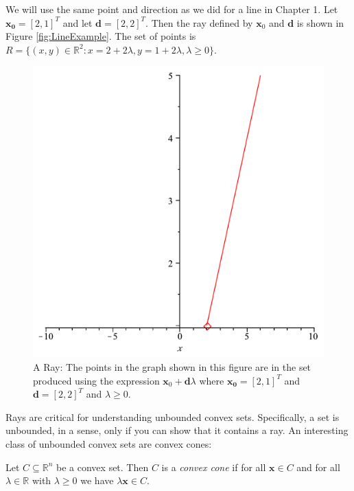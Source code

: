 \begin{example} We will use the same point and direction as we did for a line in Chapter 1. Let $\mathbf{x_0} = [2,1]^T$ and let $\mathbf{d} = [2,2]^T$. Then the ray defined by $\mathbf{x}_0$ and $\mathbf{d}$ is shown in Figure \ref{fig:LineExample}. The set of points is $R = \{(x,y) \in \mathbb{R}^2 : x = 2 + 2\lambda, y = 1 + 2\lambda, \lambda \geq 0\}$. 
\begin{figure}[ht]
\centering
\includegraphics[scale=0.25]{Ray.pdf}
\caption{A Ray: The points in the graph shown in this figure are in the set produced using the expression $\mathbf{x}_0 + \mathbf{d}\lambda$ where $\mathbf{x_0} = [2,1]^T$ and $\mathbf{d} = [2,2]^T$ and $\lambda \geq 0$.}
\label{fig:RayExample}
\end{figure}
\label{ex:BasicRay}
\end{example}

Rays are critical for understanding unbounded convex sets. Specifically, a set is unbounded, in a sense, only if you can show that it contains a ray. An interesting class of unbounded convex sets are convex cones:

\begin{definition} Let $C \subseteq \mathbb{R}^n$ be a convex set. Then $C$ is a \textit{convex cone} if for all $\mathbf{x} \in C$ and for all $\lambda \in \mathbb{R}$ with $\lambda \geq 0$ we have $\lambda \mathbf{x} \in C$.
\end{definition}

